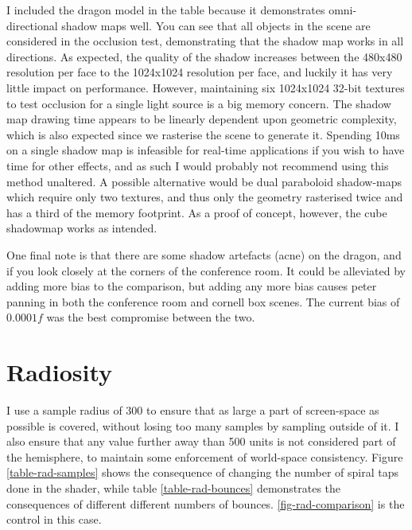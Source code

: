  I included the dragon model in the table because it demonstrates omni-directional shadow maps well. You can see that all objects in the scene are considered in the occlusion test, demonstrating that the shadow map works in all directions. As expected, the quality of the shadow increases between the 480x480 resolution per face to the 1024x1024 resolution per face, and luckily it has very little impact on performance. However, maintaining six 1024x1024 32-bit textures to test occlusion for a single light source is a big memory concern. The shadow map drawing time appears to be linearly dependent upon geometric complexity, which is also expected since we rasterise the scene to generate it. Spending 10ms on a single shadow map is infeasible for real-time applications if you wish to have time for other effects, and as such I would probably not recommend using this method unaltered. A possible alternative would be dual paraboloid shadow-maps which require only two textures, and thus only the geometry rasterised twice and has a third of the memory footprint. As a proof of concept, however, the cube shadowmap works as intended.

One final note is that there are some shadow artefacts (acne) on the dragon, and if you look closely at the corners of the conference room. It could be alleviated by adding more bias to the comparison, but adding any more bias causes peter panning in both the conference room and cornell box scenes. The current bias of $0.0001f$ was the best compromise between the two.

\section{Radiosity}
I use a sample radius of 300 to ensure that as large a part of screen-space as possible is covered, without losing too many samples by sampling outside of it. I also ensure that any value further away than 500 units is not considered part of the hemisphere, to maintain some enforcement of world-space consistency. Figure \ref{table-rad-samples} shows the consequence of changing the number of spiral taps done in the shader, while table \ref{table-rad-bounces} demonstrates the consequences of different different numbers of bounces. \ref{fig-rad-comparison} is the control in this case.

